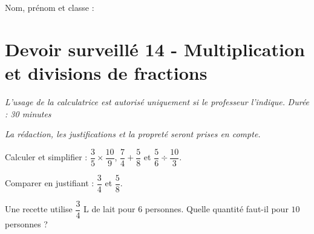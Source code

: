 \documentclass[a4paper,10pt]{report}
\begin{document}
\pagestyle{empty}
\noindent Nom, prénom et classe : \dotfill

\section*{Devoir surveillé 14 - Multiplication et divisions de fractions}

\noindent \textit{L'usage de la calculatrice est autorisé uniquement si le professeur l'indique.} \hfill \textit{Durée : 30 minutes}

\medskip
\noindent \textit{La rédaction, les justifications et la propreté seront prises en compte.}


\begin{ex}[Calculs]
Calculer et simplifier : $\dfrac{3}{5}\times\dfrac{10}{9}$, $\dfrac{7}{4}+\dfrac{5}{8}$ et $\dfrac{5}{6}\div\dfrac{10}{3}$.
\medskip\noindent\grandscarreaux{\linewidth}{5cm}
\end{ex}
\begin{ex}[Comparer]
Comparer en justifiant : $\dfrac{3}{4}$ et $\dfrac{5}{8}$.
\medskip\noindent\grandscarreaux{\linewidth}{3cm}
\end{ex}
\begin{ex}[Problème]
Une recette utilise $\dfrac{3}{4}$ L de lait pour $6$ personnes. Quelle quantité faut-il pour $10$ personnes ?
\medskip\noindent\grandscarreaux{\linewidth}{4cm}
\end{ex}
\end{document}
